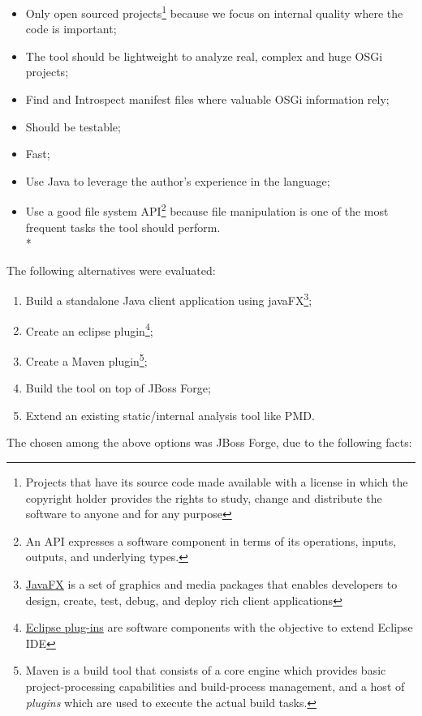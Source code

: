 \begin{itemize}
\item Only open sourced projects\footnote{Projects that have its source code made available with a license in which the copyright holder provides the rights to study, change and distribute the software to anyone and for any purpose} because we focus on internal quality where the code is important;
\item The tool should be lightweight to analyze real, complex and huge OSGi projects;
\item Find and Introspect manifest files where valuable OSGi information rely; 
\item Should be testable;
\item Fast;
\item Use Java to leverage the author's experience in the language;
\item Use a good file system API\footnote{An API expresses a software component in terms of its operations, inputs, outputs, and underlying types.} because file manipulation is one of the most frequent tasks the tool should perform.\\*
\end{itemize}
 

The following alternatives were evaluated:

\begin{enumerate}
\item Build a standalone Java client application using javaFX\footnote{\href{http://docs.oracle.com/javase/8/javase-clienttechnologies.htm}{JavaFX} is a set of graphics and media packages that enables developers to design, create, test, debug, and deploy rich client applications};
\item Create an eclipse plugin\footnote{\href{https://wiki.eclipse.org/FAQ_What_is_a_plug-in\%3F}{Eclipse plug-ins} are software components with the objective to extend Eclipse IDE};
\item Create a  Maven plugin\footnote{Maven is a build tool that consists of a core engine which provides basic project-processing capabilities and build-process management, and a host of \emph{plugins} which are used to execute the actual build tasks.};
\item Build the tool on top of JBoss Forge;
\item Extend an existing static/internal analysis tool like PMD.
\end{enumerate}

The chosen among the above options was JBoss Forge, due to the following facts:

